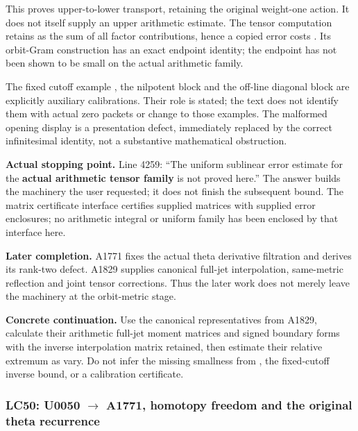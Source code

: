 \documentclass[10pt,a4paper,oneside]{report}
\begin{document}
This proves upper-to-lower transport, retaining the original weight-one
action. It does not itself supply an upper arithmetic estimate. The
tensor computation retains \protect{} as the sum of all
\protect{} factor contributions, hence a copied error costs
\protect{}. Its orbit-Gram construction has an exact
endpoint identity; the endpoint has not been shown to be small on the
actual arithmetic family.

The fixed cutoff example \protect{}, the nilpotent block
and the off-line diagonal block are explicitly auxiliary calibrations.
Their role is stated; the text does not identify them with actual zero
packets or change \protect{} to those examples. The malformed
opening display \protect{} is a presentation
defect, immediately replaced by the correct infinitesimal identity, not
a substantive mathematical obstruction.

\textbf{Actual stopping point.} Line 4259: ``The uniform sublinear error
estimate for the \textbf{actual arithmetic tensor family} is not proved
here.'' The answer builds the machinery the user requested; it does not
finish the subsequent bound. The matrix certificate interface certifies
supplied matrices with supplied error enclosures; no arithmetic integral
or uniform family has been enclosed by that interface here.

\textbf{Later completion.} A1771 fixes the actual theta derivative
filtration and derives its rank-two defect. A1829 supplies canonical
full-jet interpolation, same-metric reflection and joint tensor
corrections. Thus the later work does not merely leave the machinery at
the orbit-metric stage.

\textbf{Concrete continuation.} Use the canonical representatives from
A1829, calculate their arithmetic full-jet moment matrices and signed
boundary forms with the inverse interpolation matrix retained, then
estimate their relative extremum as \protect{} vary. Do not
infer the missing smallness from \protect{}, the fixed-cutoff
inverse bound, or a calibration certificate.

\subsubsection{\texorpdfstring{LC50: U0050
\allowbreak{}\ensuremath{→}\allowbreak{} A1771, homotopy freedom and the
original theta
recurrence}{LC50: U0050  A1771, homotopy freedom and the original theta recurrence}}\label{lc50-u0050-a1771-homotopy-freedom-and-the-original-theta-recurrence}
\end{document}
